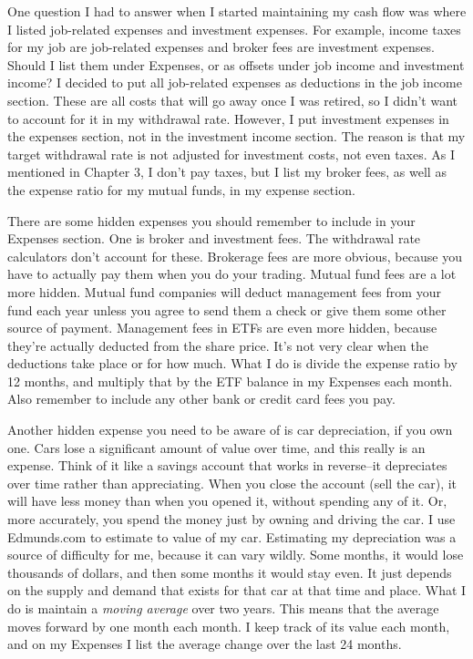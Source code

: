 One question I had to answer when I started maintaining my cash flow was where I listed job-related expenses and investment expenses. For example, income taxes for my job are job-related expenses and broker fees are investment expenses. Should I list them under Expenses, or as offsets under job income and investment income? I decided to put all job-related expenses as deductions in the job income section. These are all costs that will go away once I was retired, so I didn't want to account for it in my withdrawal rate. However, I put investment expenses in the expenses section, not in the investment income section. The reason is that my target withdrawal rate is not adjusted for investment costs, not even taxes. As I mentioned in Chapter 3, I don't pay taxes, but I list my broker fees, as well as the expense ratio for my mutual funds, in my expense section.

There are some hidden expenses you should remember to include in your Expenses section. One is broker and investment fees. The withdrawal rate calculators don't account for these. Brokerage fees are more obvious, because you have to actually pay them when you do your trading. Mutual fund fees are a lot more hidden. Mutual fund companies will deduct management fees from your fund each year unless you agree to send them a check or give them some other source of payment. Management fees in ETFs are even more hidden, because they're actually deducted from the share price. It's not very clear when the deductions take place or for how much. What I do is divide the expense ratio by 12 months, and multiply that by the ETF balance in my Expenses each month. Also remember to include any other bank or credit card fees you pay.

Another hidden expense you need to be aware of is car depreciation, if you own one. Cars lose a significant amount of value over time, and this really is an expense. Think of it like a savings account that works in reverse--it depreciates over time rather than appreciating. When you close the account (sell the car), it will have less money than when you opened it, without spending any of it. Or, more accurately, you spend the money just by owning and driving the car. I use Edmunds.com to estimate to value of my car. Estimating my depreciation was a source of difficulty for me, because it can vary wildly. Some months, it would lose thousands of dollars, and then some months it would stay even. It just depends on the supply and demand that exists for that car at that time and place. What I do is maintain a \emph{moving average} over two years. This means that the average moves forward by one month each month. I keep track of its value each month, and on my Expenses I list the average change over the last 24 months.


